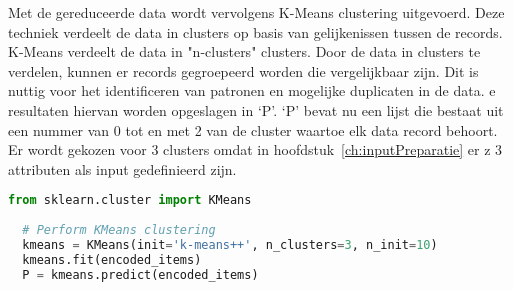 Met de gereduceerde data wordt vervolgens K-Means clustering uitgevoerd. Deze techniek verdeelt de data in clusters op basis van gelijkenissen tussen de records. K-Means verdeelt de data in "n-clusters" clusters. Door de data in clusters te verdelen, kunnen er records gegroepeerd worden die vergelijkbaar zijn. Dit is nuttig voor het identificeren van patronen en mogelijke duplicaten in de data. e resultaten hiervan worden opgeslagen in ‘P’. ‘P’ bevat nu een lijst die bestaat uit een nummer van 0 tot en met 2 van de cluster waartoe elk data record behoort. Er wordt gekozen voor 3 clusters omdat in hoofdstuk~\ref{ch:inputPreparatie} er z 3 attributen als input gedefinieerd zijn.
\begin{lstlisting}[language=Python, caption={Uitvoeren van K-Means clustering}]
  from sklearn.cluster import KMeans
  
  # Perform KMeans clustering
  kmeans = KMeans(init='k-means++', n_clusters=3, n_init=10)
  kmeans.fit(encoded_items)
  P = kmeans.predict(encoded_items)
\end{lstlisting}  


\section{}%
\label{sec:duplicateeDetectiePOC}

